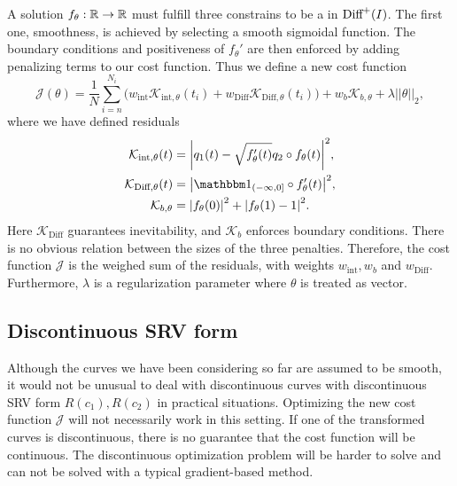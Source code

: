 A solution \(f_\theta : \mathbb{R} \rightarrow \mathbb{R} \) must fulfill three constrains to be a in \(\text{Diff}^+(I) \). The first one, smoothness, is achieved by selecting a smooth sigmoidal function. The boundary conditions and positiveness of \(f_\theta'\) are then enforced by adding penalizing terms to our cost function. Thus we define a new cost function 
\begin{equation}\label{eq:neural_cost}
  \mathcal{J}(\theta) =
  \frac{1}{N}\sum_{i=n}^{N_i}{
  \big(
  w_\text{int}{\mathcal{K}_{\text{int},\theta}(t_i)} +
  w_{\text{Diff}}{\mathcal{K}}_{\text{Diff}, \theta}(t_i)
  \big)} +
  w_{b}{\mathcal{K}}_{b,\theta} +
  \lambda||\theta||_2,
\end{equation}
where we have defined residuals
\begin{align*}
  \mathcal{K}_{\text{int},\theta}(t)  & = \abs{q_1(t) - \sqrt{f_\theta'(t)}q_2 \circ f_\theta(t)}^2, \\
  \mathcal{K}_{\text{Diff},\theta}(t) & = \abs{\one_{(-\infty,0]} \circ  f_{\theta}'(t)}^2,                  \\
  \mathcal{K}_{b,\theta}              & = \abs{f_\theta(0)}^2 + \abs{f_\theta(1) - 1}^2.
\end{align*}
Here \(\mathcal{K}_{\text{Diff}}\) guarantees inevitability, and \(\mathcal{K}_{b}\) enforces boundary conditions. There is no obvious relation between the sizes of the three penalties. Therefore, the cost function \(\mathcal{J}\) is the weighed sum of the residuals,  with weights \(w_\text{int}, w_{b} \) and  \(w_{\text{Diff}}\).  Furthermore, \(\lambda\) is a regularization parameter where \(\theta\) is treated as vector. 

\subsection{Discontinuous SRV form}\label{subsec:discont_curves}
Although the curves we have been considering so far are assumed to be smooth, it would not be unusual to deal with discontinuous curves with discontinuous SRV form \(R(c_1), R(c_2)\) in practical situations. Optimizing the new cost function \(\mathcal{J}\) will not necessarily work in this setting. If one of the transformed curves is discontinuous, there is no guarantee that the cost function will be continuous. The discontinuous optimization problem will be harder to solve and can not be solved with a typical gradient-based method.

